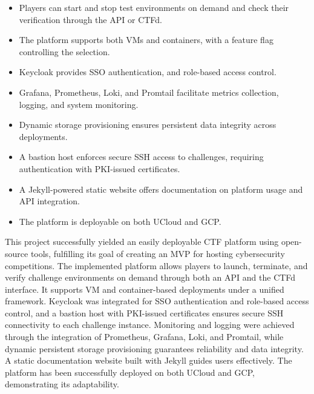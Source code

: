 \begin{itemize}
    \item Players can start and stop test environments on demand and check their verification through the API or CTFd.
    \item The platform supports both VMs and containers, with a feature flag controlling the selection.
    \item Keycloak provides SSO authentication, and role-based access control.
    \item Grafana, Prometheus, Loki, and Promtail facilitate metrics collection, logging, and system monitoring.
    \item Dynamic storage provisioning ensures persistent data integrity across deployments.
    \item A bastion host enforces secure SSH access to challenges, requiring authentication with PKI-issued certificates.
    \item A Jekyll-powered static website offers documentation on platform usage and API integration.
    \item The platform is deployable on both UCloud and GCP.
\end{itemize}

This project successfully yielded an easily deployable CTF platform using open-source tools, fulfilling its goal of creating an MVP for hosting cybersecurity competitions. The implemented platform allows players to launch, terminate, and verify challenge environments on demand through both an API and the CTFd interface. It supports VM and container-based deployments under a unified framework. Keycloak was integrated for SSO authentication and role-based access control, and a bastion host with PKI-issued certificates ensures secure SSH connectivity to each challenge instance. Monitoring and logging were achieved through the integration of Prometheus, Grafana, Loki, and Promtail, while dynamic persistent storage provisioning guarantees reliability and data integrity. A static documentation website built with Jekyll guides users effectively. The platform has been successfully deployed on both UCloud and GCP, demonstrating its adaptability. 


